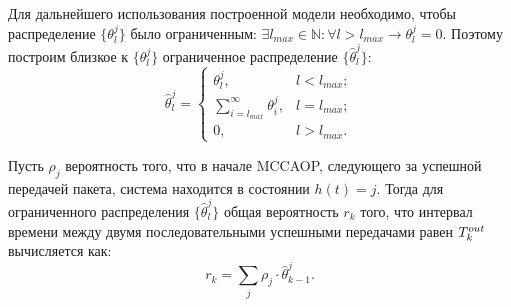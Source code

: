 Для дальнейшего использования построенной модели необходимо, чтобы распределение $\{\theta_l^j\}$ было ограниченным: $\exists l_{max} \in \mathbb{N} \colon \forall l > l_{max} \longrightarrow \theta_l^j = 0$. Поэтому построим близкое к $\{\theta_l^j\}$ ограниченное распределение $\{\hat{\theta}_l^j\}$:
\begin{equation}
	\hat{\theta}_l^j = \begin{cases}
		\theta_l^j, &l < l_{max};	\\
		\sum\limits_{i = l_{max}}^{\infty} \theta_i^j, &l = l_{max}; 	\\
		0,	&l > l_{max}. 
	\end{cases}
\end{equation} 

Пусть $\rho_j$ вероятность того, что в начале MCCAOP, следующего за успешной передачей пакета, система находится в состоянии $h(t) = j$. Тогда для ограниченного распределения $\{\hat{\theta}_l^j\}$ общая вероятность $r_k$ того, что интервал времени между двумя последовательными успешными передачами равен $T^{out}_k$ вычисляется как:
\begin{equation}
	\label{interTimeProb1}
	r_k = \sum\limits_{j} \rho_j \cdot \hat{\theta}_{k-1}^j.	
\end{equation}

